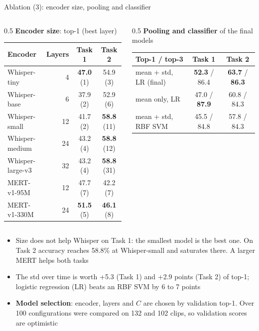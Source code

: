 \documentclass[aspectratio=169,11pt]{beamer}
\newcommand{\best}[1]{\textbf{\alert{#1}}}                       %
\newenvironment{tight}{\begin{itemize}\setlength{\itemsep}{1.5pt}\setlength{\parskip}{0pt}\setlength{\topsep}{0pt}}{\end{itemize}}
\begin{document}
\begin{frame}[t]{Ablation (3): encoder size, pooling and classifier}
  \begin{columns}[T]
    \begin{column}{0.5\textwidth}
      \small\textbf{Encoder size}: top-1 (best layer)\\[0.1em]
      {\footnotesize\setlength{\tabcolsep}{4pt}
      \begin{tabular}{@{}lrcc@{}}
        \toprule
        Encoder & Layers & Task 1 & Task 2 \\ \midrule
        Whisper-tiny     & 4  & \best{47.0} (1) & 54.9 (3) \\
        Whisper-base     & 6  & 37.9 (2) & 52.9 (6) \\
        Whisper-small    & 12 & 41.7 (2) & \best{58.8} (11) \\
        Whisper-medium   & 24 & 43.2 (4) & \best{58.8} (12) \\
        Whisper-large-v3 & 32 & 43.2 (4) & \best{58.8} (31) \\ \midrule
        MERT-v1-95M      & 12 & 47.7 (7) & 42.2 (7) \\
        MERT-v1-330M     & 24 & \best{51.5} (5) & \best{46.1} (8) \\
        \bottomrule
      \end{tabular}}
    \end{column}
    \begin{column}{0.5\textwidth}
      \small\textbf{Pooling and classifier} of the final models\\[0.1em]
      {\footnotesize\setlength{\tabcolsep}{3.5pt}
      \begin{tabular}{@{}lcc@{}}
        \toprule
        Top-1 / top-3 & Task 1 & Task 2 \\ \midrule
        mean + std, LR (final) & \best{52.3} / 86.4 & \best{63.7} / \best{86.3} \\
        mean only, LR & 47.0 / \best{87.9} & 60.8 / 84.3 \\
        mean + std, RBF SVM & 45.5 / 84.8 & 57.8 / 84.3 \\
        \bottomrule
      \end{tabular}}
    \end{column}
  \end{columns}
  \begin{tight}\footnotesize
    \item Size does not help Whisper on Task 1: the \alert{smallest} model is the best one. On Task 2 accuracy reaches 58.8\% at Whisper-small and \alert{saturates} there. A larger MERT helps both tasks
    \item The std over time is worth +5.3 (Task 1) and +2.9 points (Task 2) of top-1; logistic regression (LR) beats an RBF SVM by 6 to 7 points
    \item \textbf{Model selection}: encoder, layers and $C$ are chosen by validation top-1. Over 100 configurations were compared on 132 and 102 clips, so validation scores are optimistic
  \end{tight}
\end{frame}
\end{document}
